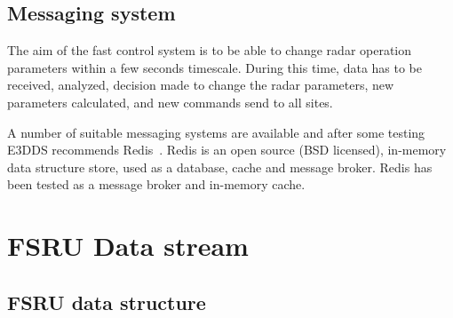 \documentclass[12pt,a4paper]{article}
\begin{document}
\subsection{Messaging system}
The aim of the fast control system is to be able to change radar operation parameters within a few seconds timescale. 
During this time, data has to be received, analyzed, decision made to change the radar parameters, new parameters calculated, and new commands send to all sites. 

A number of suitable messaging systems are available and after some testing E3DDS recommends Redis~\cite{redis}. Redis is an open source (BSD licensed), in-memory data structure store, used as a database, cache and message broker. 
Redis has been tested as a message broker and in-memory cache. 


\section{FSRU Data stream}


\subsection{FSRU data structure}
\end{document}
